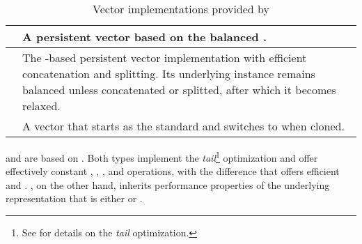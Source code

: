 \begin{table}[!htbp]

    \centering
    \begin{tabular} { |p{18mm}|p{112mm}| }
        \hline
        \rbvec{} & A persistent vector based on the balanced \rrbtree{}. \\ \hline
        \rrbvec{} & The \rrbtree{}-based persistent vector implementation with efficient concatenation and splitting. Its underlying \rrbtree{} instance remains balanced unless concatenated or splitted, after which it becomes relaxed. \\ \hline
        \pvec{} & A vector that starts as the standard and switches to \rrbvec{} when cloned. \\ \hline
    \end{tabular}

    \label{tab:vec-implementations}
    \caption{Vector implementations provided by \pvecrs{}}
\end{table}

\rbvec{} and \rrbvec{} are based on \rrbtree{}. Both types implement the \emph{tail}\footnote{See  for details on the \emph{tail} optimization.} optimization and offer effectively constant , , , and  operations, with the difference that \rrbvec{} offers efficient  and . \pvec{}, on the other hand, inherits performance properties of the underlying representation that is either \stdvec{} or \rrbvec{}.

